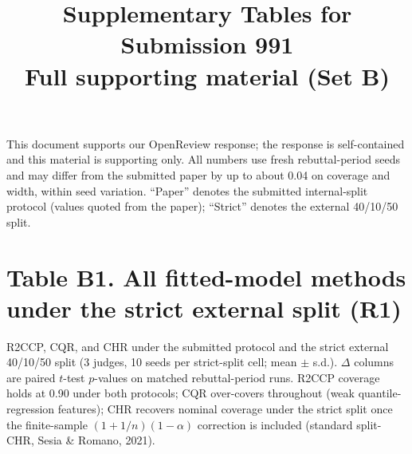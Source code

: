 \documentclass[11pt]{article}
\title{Supplementary Tables for Submission 991\\
\large Full supporting material (Set B)}
\author{}
\date{}
\begin{document}
\maketitle

\noindent
This document supports our OpenReview response; the response is self-contained and this
material is supporting only. All numbers use fresh rebuttal-period seeds and may differ
from the submitted paper by up to about 0.04 on coverage and width, within seed
variation. ``Paper'' denotes the submitted internal-split protocol (values quoted from
the paper); ``Strict'' denotes the external 40/10/50 split.

\bigskip

\section*{Table B1. All fitted-model methods under the strict external split (R1)}

R2CCP, CQR, and CHR under the submitted protocol and the strict external 40/10/50 split
(3 judges, 10 seeds per strict-split cell; mean $\pm$ s.d.). $\Delta$ columns are paired
$t$-test $p$-values on matched rebuttal-period runs. R2CCP coverage holds at 0.90 under
both protocols; CQR over-covers throughout (weak quantile-regression features); CHR
recovers nominal coverage under the strict split once the finite-sample
$(1+1/n)(1-\alpha)$ correction is included (standard split-CHR, Sesia \& Romano, 2021).
\end{document}

